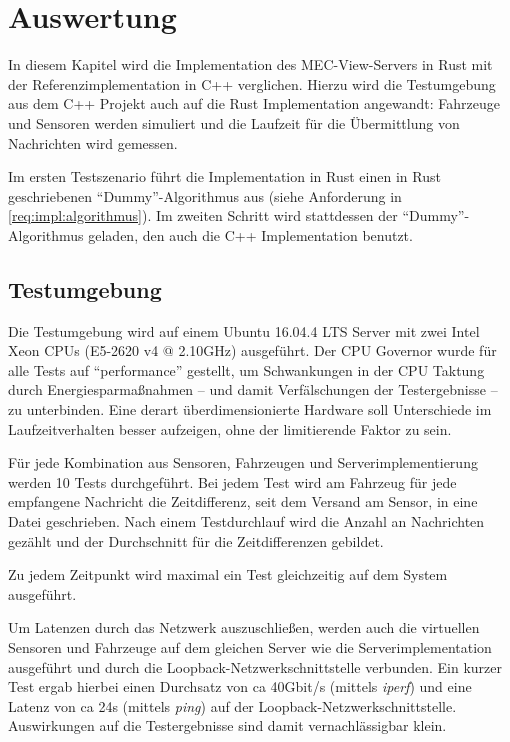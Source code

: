 
			
\chapter{Auswertung}
\label{eval}

In diesem Kapitel wird die Implementation des MEC-View-Servers in Rust mit der Referenzimplementation in C++ verglichen.
Hierzu wird die Testumgebung aus dem C++ Projekt auch auf die Rust Implementation angewandt: Fahrzeuge und Sensoren werden simuliert und die Laufzeit für die Übermittlung von Nachrichten wird gemessen.

Im ersten Testszenario führt die Implementation in Rust einen in Rust geschriebenen \enquote{Dummy}-Algorithmus aus (siehe Anforderung  in \autoref{req:impl:algorithmus}).
Im zweiten Schritt wird stattdessen der \enquote{Dummy}-Algorithmus geladen, den auch die C++ Implementation benutzt.



\section{Testumgebung}

Die Testumgebung wird auf einem Ubuntu 16.04.4 LTS Server mit zwei Intel Xeon CPUs (E5-2620 v4 @ 2.10GHz) ausgeführt.
Der CPU Governor wurde für alle Tests auf \enquote{performance} gestellt, um Schwankungen in der CPU Taktung durch Energiesparmaßnahmen -- und damit Verfälschungen der Testergebnisse -- zu unterbinden.
Eine derart überdimensionierte Hardware soll Unterschiede im Laufzeitverhalten besser aufzeigen, ohne der limitierende Faktor zu sein.

Für jede Kombination aus Sensoren, Fahrzeugen und Serverimplementierung werden 10 Tests durchgeführt.
Bei jedem Test wird am Fahrzeug für jede empfangene Nachricht die Zeitdifferenz, seit dem Versand am Sensor, in eine Datei geschrieben.
Nach einem Testdurchlauf wird die Anzahl an Nachrichten gezählt und der Durchschnitt für die Zeitdifferenzen gebildet.

Zu jedem Zeitpunkt wird maximal ein Test gleichzeitig auf dem System ausgeführt.

Um Latenzen durch das Netzwerk auszuschließen, werden auch die virtuellen Sensoren und Fahrzeuge auf dem gleichen Server wie die Serverimplementation ausgeführt und durch die Loopback-Netzwerkschnittstelle verbunden.
Ein kurzer Test ergab hierbei einen Durchsatz von ca 40Gbit/s (mittels \textit{iperf}) und eine Latenz von ca 24\textmu{}s (mittels \textit{ping}) auf der Loopback-Netzwerkschnittstelle.
Auswirkungen auf die Testergebnisse sind damit vernachlässigbar klein.

